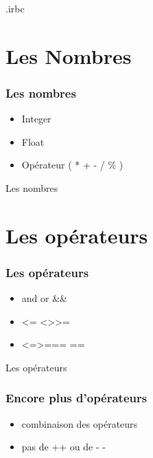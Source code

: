 \documentclass{beamer}
\begin{document}
\begin{frame}
  \begin{beamerboxesrounded}{.irbc}
    
  \end{beamerboxesrounded}
\end{frame}

\section{Les Nombres}

\begin{frame}
  \frametitle{Les nombres}
  \begin{itemize}
    \item Integer
    \item Float
    \item Op\'erateur ( * + - / \% )
  \end{itemize}
\end{frame}

\begin{frame}
  \begin{beamerboxesrounded}{Les nombres}
    
  \end{beamerboxesrounded}
\end{frame}

\section{Les opérateurs}

\begin{frame}
  \frametitle{Les op\'erateurs}
  \begin{itemize}
    \item and or \&\& \textbar\textbar
    \item \textless= \textless \textgreater \textgreater=
    \item \textless=\textgreater === ==
  \end{itemize}
\end{frame}

\begin{frame}
  \begin{beamerboxesrounded}{Les op\'erateurs}
    
  \end{beamerboxesrounded}
\end{frame}

\begin{frame}
  \frametitle{Encore plus d'op\'erateurs}
  \begin{itemize}
    \item combinaison des op\'erateurs
    \item pas de ++ ou de - -
  \end{itemize}
\end{frame}
\end{document}
